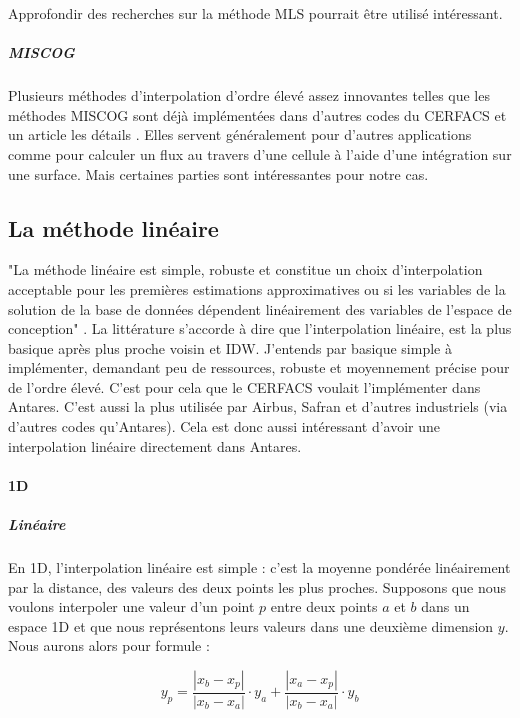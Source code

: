 Approfondir des recherches sur la méthode \ac{MLS} \cite{MLS} \cite{levin}  pourrait être utilisé intéressant.

\subparagraph{MISCOG}

Plusieurs méthodes d'interpolation d'ordre élevé assez innovantes telles que les méthodes \ac{MISCOG} sont déjà implémentées dans d'autres codes du CERFACS et un article les détails \cite{laborderie2018}. Elles servent généralement pour d'autres applications comme pour calculer un flux au travers d'une cellule à l'aide d'une intégration sur une surface. Mais certaines parties sont intéressantes pour notre cas.  %


\subsection{La méthode linéaire}
"La méthode linéaire est simple, robuste et constitue un choix d'interpolation acceptable pour les premières estimations approximatives ou si les variables de la solution de la base de données dépendent linéairement des variables de l'espace de conception" \cite{palmer2009}.
La littérature \cite{fluidssengineer} s'accorde à dire que l'interpolation linéaire, est la plus basique après plus proche voisin et IDW. J'entends par basique simple à implémenter, demandant peu de ressources, robuste et moyennement précise pour de l'ordre élevé. C'est pour cela que le CERFACS voulait l'implémenter dans Antares. C'est aussi la plus utilisée par Airbus, Safran et d'autres industriels (via d'autres codes qu'Antares). Cela est donc aussi intéressant d'avoir une interpolation linéaire directement dans Antares.


\paragraph{1D}
\subparagraph{Linéaire}

En 1D, l'interpolation linéaire est simple : c'est la moyenne pondérée linéairement par la distance, des valeurs des deux points les plus proches.
Supposons que nous voulons interpoler une valeur d'un point \( p \) entre deux points \( a \) et \( b \) dans un espace 1D
et que nous représentons leurs valeurs dans une deuxième dimension \( y \).
Nous aurons alors pour formule :

\[
y_p = \frac{|x_b - x_p|}{|x_b - x_a|} \cdot y_a + \frac{|x_a - x_p|}{|x_b - x_a|} \cdot y_b
\]

